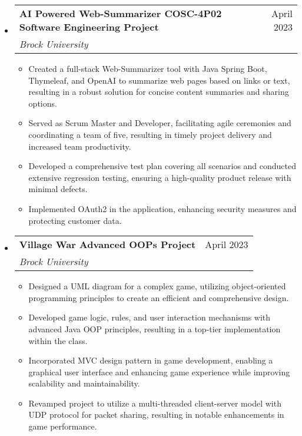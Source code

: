 \documentclass[letterpaper,11pt]{article}
\makeatletter
\newcommand{\resumeItem}[1]{
  \item\small{
    {#1 \vspace{-2pt}}
  }
}
\newcommand{\resumeSubheading}[4]{
  \vspace{-2pt}\item
    \begin{tabular*}{0.97\textwidth}[t]{l@{\extracolsep{\fill}}r}
      \textbf{#1} & #2 \\
      \textit{\small#3} & \textit{\small #4} \\
    \end{tabular*}\vspace{-7pt}
}
\newcommand{\resumeSubHeadingListStart}{\begin{itemize}[leftmargin=0.15in, label={}]}
\newcommand{\resumeSubHeadingListEnd}{\end{itemize}}
\newcommand{\resumeItemListStart}{\begin{itemize}}
\newcommand{\resumeItemListEnd}{\end{itemize}\vspace{-5pt}}
\makeatother
\begin{document}
\begin{center}
\resumeSubHeadingListStart
  \resumeSubheading
    {AI Powered Web-Summarizer COSC-4P02 Software Engineering Project}{April 2023}
    {Brock University}{}
    \resumeItemListStart
    \resumeItem{Created a full-stack Web-Summarizer tool with Java Spring Boot, Thymeleaf, and OpenAI to summarize web pages based on links or text, resulting in a robust solution for concise content summaries and sharing options.}
      \resumeItem{Served as Scrum Master and Developer, facilitating agile ceremonies and coordinating a team of five, resulting in timely project delivery and increased team productivity.}
      \resumeItem{Developed a comprehensive test plan covering all scenarios and conducted extensive regression testing, ensuring a high-quality product release with minimal defects.}
      \resumeItem{Implemented OAuth2 in the application, enhancing security measures and protecting customer data.}
    \resumeItemListEnd
\resumeSubHeadingListEnd

\resumeSubHeadingListStart
  \resumeSubheading
    {Village War Advanced OOPs Project}{April 2023}
    {Brock University}{}
    \resumeItemListStart
      \resumeItem{Designed a UML diagram for a complex game, utilizing object-oriented programming principles to create an efficient and comprehensive design.}
      \resumeItem{Developed game logic, rules, and user interaction mechanisms with advanced Java OOP principles, resulting in a top-tier implementation within the class.}
      \resumeItem{Incorporated MVC design pattern in game development, enabling a graphical user interface and enhancing game experience while improving scalability and maintainability.}
      \resumeItem{Revamped project to utilize a multi-threaded client-server model with UDP protocol for packet sharing, resulting in notable enhancements in game performance.}
    \resumeItemListEnd
\resumeSubHeadingListEnd
\end{center}
\end{document}
